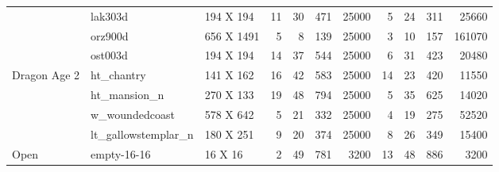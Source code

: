 \begin{table*}[]
\begin{tabular}{@{}lll|rrrr|rrrr@{}}
                                & lak303d               & 194 X 194  & 11                      & 30                      & 471                        & 25000                   & 5                       & 24                      & 311                        & 25660                   \\
                                & orz900d               & 656 X 1491 & 5                       & 8                       & 139                        & 25000                   & 3                       & 10                      & 157                        & 161070                  \\
                                & ost003d               & 194 X 194  & 14                      & 37                      & 544                        & 25000                   & 6                       & 31                      & 423                        & 20480                   \\
\midrule \multirow{4}{*}{Dragon Age 2}   & ht\_chantry           & 141 X 162  & 16                      & 42                      & 583                        & 25000                   & 14                      & 23                      & 420                        & 11550                   \\
                                & ht\_mansion\_n        & 270 X 133  & 19                      & 48                      & 794                        & 25000                   & 5                       & 35                      & 625                        & 14020                   \\
                                & w\_woundedcoast       & 578 X 642  & 5                       & 21                      & 332                        & 25000                   & 4                       & 19                      & 275                        & 52520                   \\
                                & lt\_gallowstemplar\_n & 180 X 251  & 9                       & 20                      & 374                        & 25000                   & 8                       & 26                      & 349                        & 15400                   \\
\midrule \multirow{4}{*}{Open}           & empty-16-16           & 16 X 16    & 2                       & 49                      & 781                        & 3200                    & 13                      & 48                      & 886                        & 3200                    \\

\end{tabular}
\end{table*}
